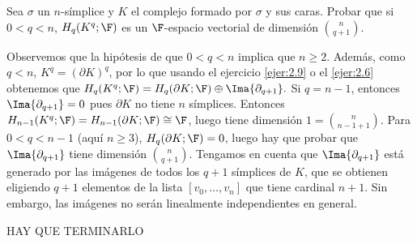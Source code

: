 \documentclass[twoside]{article}
\begin{document}
\newpage

\begin{ejercicio}{2.13}
Sea $σ$ un $n$-símplice y $K$ el complejo formado por $σ$ y sus caras. Probar
que si $0 < q < n$, $H_q(K^q; \F)$ es un $\F$-espacio vectorial de dimensión $\binom{n}{q+1}$.
\end{ejercicio}
\begin{solucion}
Observemos que la hipótesis de que $0<q<n$ implica que $n\geq 2$. Además, como $q<n$, $K^q=(\partial K)^q$, por lo que usando el ejercicio \ref{ejer:2.9} o el \ref{ejer:2.6} obtenemos que $H_q(K^q; \F)=H_q(\partial K; \F)\oplus\Ima{\partial_{q+1}}.$ Si $q=n-1$, entonces $\Ima{\partial_{q+1}}=0$ pues $\partial K$ no tiene $n$ símplices. Entonces $H_{n-1}(K^q; \F)=H_{n-1}(\partial K; \F)\cong\F$, luego tiene dimensión $1=\binom{n}{n-1+1}$. Para $0<q<n-1$ (aquí $n\geq 3$), $H_q(\partial K; \F)=0$, luego hay que probar que $\Ima{\partial_{q+1}}$ tiene dimensión $\binom{n}{q+1}$. Tengamos en cuenta que $\Ima{\partial_{q+1}}$ está generado por las imágenes de todos los $q+1$ símplices de $K$, que se obtienen eligiendo $q+1$ elementos de la lista $[v_0,\dots, v_n]$ que tiene cardinal $n+1$. Sin embargo, las imágenes no serán linealmente independientes en general. 


HAY QUE TERMINARLO
\end{solucion}

\newpage
\end{document}
